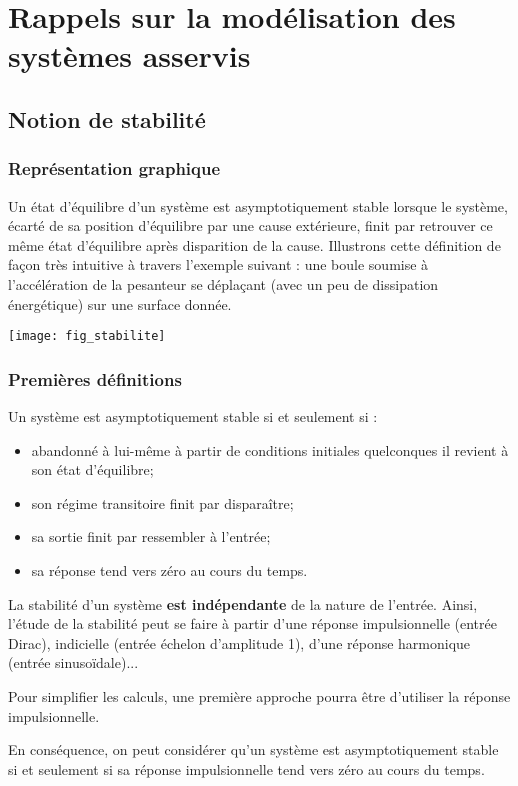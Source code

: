 \setchapterpreamble[u]{\margintoc}

\chapter{Rappels sur la modélisation des systèmes asservis}


\section{Notion de stabilité}
\subsection{Représentation graphique \cite{1}}
Un état d'équilibre d'un système est asymptotiquement stable lorsque le système, écarté de sa position d'équilibre par une
cause extérieure, finit par retrouver ce même état d'équilibre après disparition de la
cause.
Illustrons cette définition de façon très intuitive à travers l'exemple suivant : une boule
soumise à l'accélération de la pesanteur se déplaçant (avec un peu de dissipation
énergétique) sur une surface donnée.

\begin{center}
\texttt{[image: fig\_stabilite]}
\end{center}
\subsection{Premières définitions}
\begin{defi}

Un système est asymptotiquement stable si et seulement si : 
\begin{itemize}
\item abandonné à lui-même à partir de conditions initiales quelconques il revient à son état d'équilibre;
\item son régime transitoire finit par disparaître;
\item sa sortie finit par ressembler à l'entrée;
\item sa réponse tend vers zéro au cours du temps.
\end{itemize}

\end{defi}

\begin{remarque}
La stabilité d'un système \textbf{est indépendante} de la nature de l'entrée. Ainsi, l'étude de la stabilité peut se faire à partir d'une réponse impulsionnelle (entrée Dirac), indicielle (entrée échelon d'amplitude 1), d'une réponse harmonique (entrée sinusoïdale)...

Pour simplifier les calculs, une première approche pourra être d'utiliser la réponse impulsionnelle. 
\end{remarque}
\begin{defi}{}
En conséquence, on peut considérer qu'un système est asymptotiquement stable si et seulement si sa réponse impulsionnelle tend vers zéro au cours du temps.
\end{defi}

